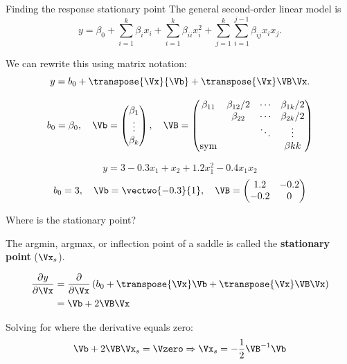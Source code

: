 \documentclass[10pt]{beamer}
\begin{document}
\begin{frame}{Finding the response stationary point}
The general second-order linear model is
\[ y = \beta_0 + \sum_{i=1}^k\beta_ix_i + \sum_{i=1}^k\beta_{ii}x_i^2 + \sum_{j=1}^k\sum_{i=1}^{j-1}\beta_{ij}x_ix_j. \]

\pause
We can rewrite this using matrix notation:
\[ y = b_0 + \transpose{\Vx}{\Vb} + \transpose{\Vx}\VB\Vx. \]

\[ b_0 = \beta_0, \quad \Vb = \begin{pmatrix}\beta_1\\ \vdots \\ \beta_k \end{pmatrix}, \quad \VB = \begin{pmatrix} \beta_{11} & \beta_{12}/2 & \cdots & \beta_{1k}/2 \\ & \beta_{22} & \cdots & \beta_{2k}/2 \\ & & \ddots & \vdots \\ \mathrm{sym} & & & \beta{kk} \end{pmatrix} \]

\pause
\[ y = 3 - 0.3x_1 + x_2 + 1.2x_1^2 - 0.4x_1x_2 \]
\[ b_0 = 3,\quad \Vb = \vectwo{-0.3}{1},\quad \VB = \begin{pmatrix} 1.2 & -0.2 \\ -0.2 & 0 \end{pmatrix} \]
\end{frame}

\begin{frame}{Where is the stationary point?}

The argmin, argmax, or inflection point of a saddle is called the \textbf{stationary point} ($\Vx_s$).

\pause
\begin{align*}
	\frac{\partial y}{\partial \Vx} &= \frac{\partial}{\partial \Vx}\left(b_0 + \transpose{\Vx}\Vb + \transpose{\Vx}\VB\Vx \right) \\
		&= 	\Vb + 2\VB\Vx 
\end{align*}

\pause
Solving for where the derivative equals zero:
\[ \Vb + 2\VB\Vx_s = \Vzero \Rightarrow \Vx_s = -\frac{1}{2}\VB^{-1}\Vb \]
	
\end{frame}
\end{document}
